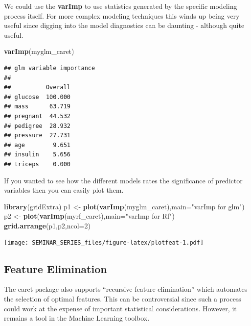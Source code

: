 \documentclass[
]{book}
\newenvironment{Shaded}{\begin{snugshade}}{\end{snugshade}}
\newcommand{\DataTypeTok}[1]{\textcolor[rgb]{0.13,0.29,0.53}{#1}}
\newcommand{\DecValTok}[1]{\textcolor[rgb]{0.00,0.00,0.81}{#1}}
\newcommand{\KeywordTok}[1]{\textcolor[rgb]{0.13,0.29,0.53}{\textbf{#1}}}
\newcommand{\NormalTok}[1]{#1}
\newcommand{\StringTok}[1]{\textcolor[rgb]{0.31,0.60,0.02}{#1}}
\begin{document}
We could use the \textbf{varImp} to use statistics generated by the specific modeling process itself. For more complex modeling techniques this winds up being very useful since digging into the model diagnostics can be daunting - although quite useful.

\begin{Shaded}
\begin{Highlighting}[]
\KeywordTok{varImp}\NormalTok{(myglm_caret)}
\end{Highlighting}
\end{Shaded}

\begin{verbatim}
## glm variable importance
## 
##          Overall
## glucose  100.000
## mass      63.719
## pregnant  44.532
## pedigree  28.932
## pressure  27.731
## age        9.651
## insulin    5.656
## triceps    0.000
\end{verbatim}

If you wanted to see how the different models rates the significance of predictor variables then you can easily plot them.

\begin{Shaded}
\begin{Highlighting}[]
\KeywordTok{library}\NormalTok{(gridExtra)}
\NormalTok{p1 <-}\StringTok{ }\KeywordTok{plot}\NormalTok{(}\KeywordTok{varImp}\NormalTok{(myglm_caret),}\DataTypeTok{main=}\StringTok{"varImp for glm"}\NormalTok{)}
\NormalTok{p2 <-}\StringTok{ }\KeywordTok{plot}\NormalTok{(}\KeywordTok{varImp}\NormalTok{(myrf_caret),}\DataTypeTok{main=}\StringTok{"varImp for Rf"}\NormalTok{)}
\KeywordTok{grid.arrange}\NormalTok{(p1,p2,}\DataTypeTok{ncol=}\DecValTok{2}\NormalTok{)}
\end{Highlighting}
\end{Shaded}

\texttt{[image: SEMINAR\_SERIES\_files/figure-latex/plotfeat-1.pdf]}

\hypertarget{feature-elimination}{%
\subsection{Feature Elimination}\label{feature-elimination}}

The caret package also supports ``recursive feature elimination'' which automates the selection of optimal features. This can be controversial since such a process could work at the expense of important statistical considerations. However, it remains a tool in the Machine Learning toolbox.
\end{document}
